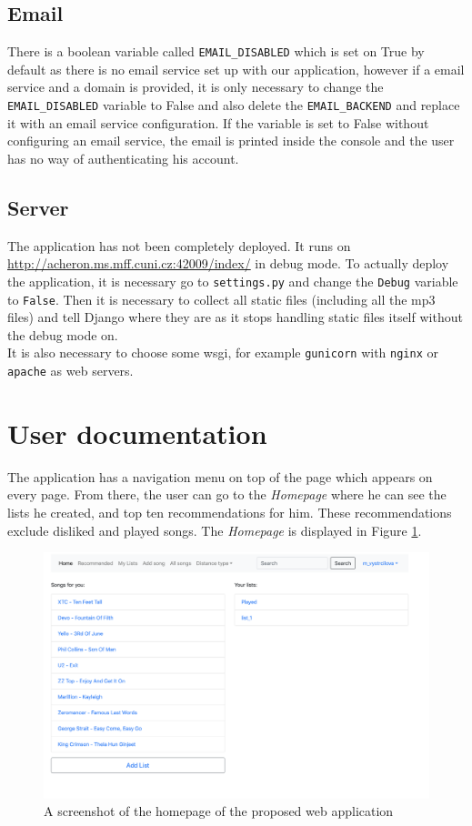 \subsection{Email}
There is a boolean variable called \texttt{EMAIL\_DISABLED} which is set on True by default as there is no email service set up with our application, however if a email service and a domain is provided, it is only necessary to change the \texttt{EMAIL\_DISABLED} variable to False and also delete the \texttt{EMAIL\_BACKEND} and replace it with an email service configuration. If the variable is set to False without configuring an email service, the email is printed inside the console and the user has no way of authenticating his account.

\subsection{Server}

The application has not been completely deployed. It runs on \url{http://acheron.ms.mff.cuni.cz:42009/index/} in debug mode. To actually deploy the application, it is necessary go to \texttt{settings.py} and change the \texttt{Debug} variable to \texttt{False}. Then it is necessary to collect all static files (including all the mp3 files) and tell Django where they are as it stops handling static files itself without the debug mode on.\\
It is also necessary to choose some wsgi, for example \texttt{gunicorn} with \texttt{nginx} or \texttt{apache} as web servers.

\section{User documentation}\label{sec:user_docs}
The application has a navigation menu on top of the page which appears on every page. From there, the user can go to the \textit{Homepage} where he can see the lists he created, and top ten recommendations for him. These recommendations exclude disliked and played songs. The \textit{Homepage} is displayed in Figure \ref{fig:home_page}. \\

\begin{figure}[H]
    \centering
	\includegraphics[width=1\linewidth]{./img/home_page.png}
	\caption{A screenshot of the homepage of the proposed web application}
	\label{fig:home_page}
\end{figure}

